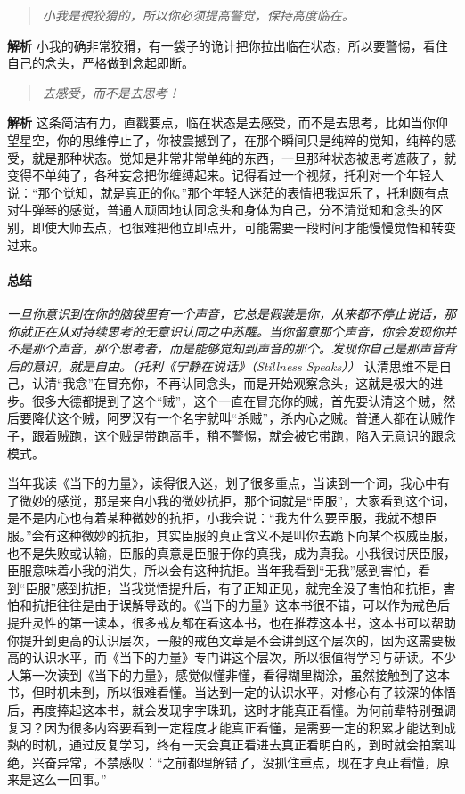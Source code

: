 \begin{quote}\it
    小我是很狡猾的，所以你必须提高警觉，保持高度临在。
\end{quote}

\textbf{解析} 小我的确非常狡猾，有一袋子的诡计把你拉出临在状态，所以要警惕，看住自己的念头，严格做到念起即断。

\begin{quote}\it
    去感受，而不是去思考！
\end{quote}

\textbf{解析} 这条简洁有力，直戳要点，临在状态是去感受，而不是去思考，比如当你仰望星空，你的思维停止了，你被震撼到了，在那个瞬间只是纯粹的觉知，纯粹的感受，就是那种状态。觉知是非常非常单纯的东西，一旦那种状态被思考遮蔽了，就变得不单纯了，各种妄念把你缠缚起来。记得看过一个视频，托利对一个年轻人说：“那个觉知，就是真正的你。”那个年轻人迷茫的表情把我逗乐了，托利颇有点对牛弹琴的感觉，普通人顽固地认同念头和身体为自己，分不清觉知和念头的区别，即使大师去点，也很难把他立即点开，可能需要一段时间才能慢慢觉悟和转变过来。

\paragraph*{总结}

\textit{一旦你意识到在你的脑袋里有一个声音，它总是假装是你，从来都不停止说话，那你就正在从对持续思考的无意识认同之中苏醒。当你留意那个声音，你会发现你并不是那个声音，那个思考者，而是能够觉知到声音的那个。发现你自己是那声音背后的意识，就是自由。（托利《宁静在说话》（Stillness Speaks））} 认清思维不是自己，认清“我念”在冒充你，不再认同念头，而是开始观察念头，这就是极大的进步。很多大德都提到了这个“贼”，这个一直在冒充你的贼，首先要认清这个贼，然后要降伏这个贼，阿罗汉有一个名字就叫“杀贼”，杀内心之贼。普通人都在认贼作子，跟着贼跑，这个贼是带跑高手，稍不警惕，就会被它带跑，陷入无意识的跟念模式。

当年我读《当下的力量》，读得很入迷，划了很多重点，当读到一个词，我心中有了微妙的感觉，那是来自小我的微妙抗拒，那个词就是“臣服”，大家看到这个词，是不是内心也有着某种微妙的抗拒，小我会说：“我为什么要臣服，我就不想臣服。”会有这种微妙的抗拒，其实臣服的真正含义不是叫你去跪下向某个权威臣服，也不是失败或认输，臣服的真意是臣服于你的真我，成为真我。小我很讨厌臣服，臣服意味着小我的消失，所以会有这种抗拒。当年我看到“无我”感到害怕，看到“臣服”感到抗拒，当我觉悟提升后，有了正知正见，就完全没了害怕和抗拒，害怕和抗拒往往是由于误解导致的。《当下的力量》这本书很不错，可以作为戒色后提升灵性的第一读本，很多戒友都在看这本书，也在推荐这本书，这本书可以帮助你提升到更高的认识层次，一般的戒色文章是不会讲到这个层次的，因为这需要极高的认识水平，而《当下的力量》专门讲这个层次，所以很值得学习与研读。不少人第一次读到《当下的力量》，感觉似懂非懂，看得糊里糊涂，虽然接触到了这本书，但时机未到，所以很难看懂。当达到一定的认识水平，对修心有了较深的体悟后，再度捧起这本书，就会发现字字珠玑，这时才能真正看懂。为何前辈特别强调复习？因为很多内容要看到一定程度才能真正看懂，是需要一定的积累才能达到成熟的时机，通过反复学习，终有一天会真正看进去真正看明白的，到时就会拍案叫绝，兴奋异常，不禁感叹：“之前都理解错了，没抓住重点，现在才真正看懂，原来是这么一回事。”

